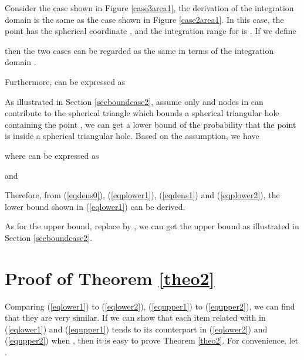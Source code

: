\documentclass[journal, twoside]{IEEEtran}
\begin{document}
\begin{IEEEproof}
Consider the case shown in Figure \ref{case3area1}, the derivation
of the integration domain  is the same as the case shown 
in Figure \ref{case2area1}. In this case, the point 
has the spherical coordinate , and the integration range
for  is . If we define

\noindent then the two cases can be regarded as the same in terms of the integration domain .

Furthermore,  can be expressed as 


As illustrated in Section \ref{secboundcase2}, assume only  
and nodes in  can
contribute to the spherical triangle which bounds a spherical triangular hole containing the
point , we can get a lower bound of the probability that the
point  is inside a spherical triangular hole. Based on the assumption,
we have


\noindent where  can be expressed as


\noindent and


Therefore, from (\ref{eqdens0}), (\ref{eqplower1}), (\ref{eqdens1}) and (\ref{eqplower2}), 
the lower bound shown in (\ref{eqlower1}) can be derived.

As for the upper bound, replace  by 
, we can get the upper bound as illustrated in Section
 \ref{secboundcase2}.

\end{IEEEproof}


\section{Proof of Theorem \ref{theo2}} \label{app3}

Comparing (\ref{eqlower1}) to (\ref{eqlower2}), (\ref{equpper1}) to (\ref{equpper2}), we
can find that they are very similar. If we can show that each item related with  in (\ref{eqlower1}) and (\ref{equpper1}) tends to its counterpart in (\ref{eqlower2}) and (\ref{equpper2}) when , then it is easy to prove Theorem \ref{theo2}. For convenience,  let .
\end{document}
